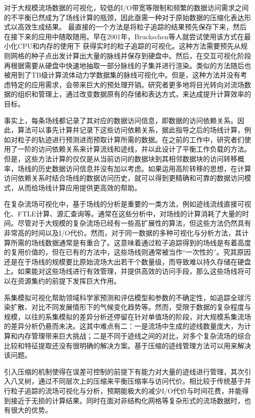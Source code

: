 对于大规模流场数据的可视化，较低的I/O带宽等限制和频繁的数据访问需求之间的不平衡已然成为了场线计算的瓶颈，因此亟需一种对于原始数据的压缩化表达形式以高效生成结果。
最直接的一个方法是将粒子追踪的结果预先保存下来，然后在接下来的应用中随取随用。早在2001年，Bruckschen等人就尝试使用该方式在最小化CPU和内存的使用下
获得实时的粒子追踪的可视化\parencite{BruckschenKHJ01}。这种方法需要预先从规则网格的种子点出发计算出大量的脉线并保存到硬盘中。然后，在交互可视化阶段再根据需要从硬盘中快速地抽取一部分脉线的子集并进行渲染。类似的方法随后也被用到了TB级计算流体动力学数据集的脉线可视化中\parencite{EllsworthGM04}。但是，这种方法并没有考虑特定的应用需求，会带来巨大的预处理开销。研究者更多地将目光转向对流场数据的组织和管理上，通过改变数据原有的存储和表达方式，来达成提升计算效率的目标。

事实上，每条场线都记录了其对应的数据访问信息，即数据的访问依赖关系。因此，算法可以事先计算并记录下这些访问依赖关系，据此指导之后的场线计算，例如对粒子的轨迹进行预测进而预取计算所需的数据。在之前的工作中，研究者们使用了一阶的访问依赖关系来计算流线和迹线，并以此设计了平衡工作负载的方法。但是，这些方法计算的仅仅是从当前访问的数据块到其相邻数据块的访问转移概率，场线的历史数据访问信息并没有加以考虑。如果运用高阶转移的思想，在计算访问依赖关系时结合场线的数据访问历史，就可以得到更精确和可靠的数据访问模式，从而给场线计算应用提供更高效的帮助。

在复杂流场可视化中，基于场线的分析是重要的一类方法，例如迹线流线直接可视化、FTLE计算、源汇查询等。通常在这些分析中，对场线的计算消耗了大量的时间。尽管对于大规模的复杂流场已经有一些高扩展性的算法，但这些方法仍然具有非常高的时间以及I/O代价。然而，对于同一数据的多种可视化与分析方法，其计算所需的场线数据通常是有重合了。这意味着通过粒子追踪得到的场线是有着高度的复用价值的，但在已有的方法中，这些场线则通常被当作“一次性的”。究其原因还是在于场线的规模要比原始流场大出若干个数量级，而导致难以持久存储在硬盘上。如果能对这些场线进行有效管理，并提供高效的访问手段，那么这些场线将可以在资源集约的前提下发挥巨大作用。

系集模拟可视化帮助领域科学家预测和评估模型和参数的不确定性，如追踪全球污染扩散、对比不同发展情形下的气候变化趋势等。然而，受限于数据的复杂程度与规模，以往的系集模拟的差异分析还停留在针对单值场的阶段，对大规模系集流场的差异分析仍悬而未决。这其中难点有二：一是流场中生成的迹线数量庞大，为计算和内存管理带来巨大挑战；二是不同于迹线之间的对比，对多个复杂流场的综合比较和特征提取还没有很明确的解决方案。基于压缩的迹线管理方法可以用来解决该问题。

引入压缩的机制使得在误差可控制的前提下有能力对大量的迹线进行管理，其次引入八叉树，通过不同层次上的压缩来平衡压缩率与访问代价。相比较于传统基于并行粒子追踪的流场可视化与分析，预期能极大的减少I/O代价与时间花费，并能得到接近于无损的计算结果。同时在面对非结构化网格等复杂形式的流场数据时，也有很大的优势。

